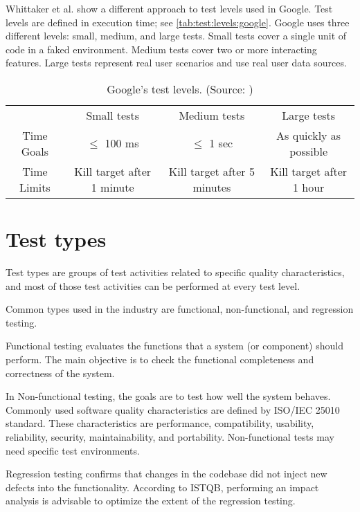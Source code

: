 Whittaker et al. show \cite{google:2012} a different approach to test levels used
in Google.
Test levels are defined in execution time; see \autoref{tab:test:levels:google}.
Google uses three different levels: small, medium, and large tests.
Small tests cover a single unit of code in a faked environment.
Medium tests cover two or more interacting features.
Large tests represent real user scenarios and use real user data sources.

\begin{table}
    \begin{tabular}{|| c c c c ||}
        \hline
        & Small tests & Medium tests & Large tests\\
        Time Goals & $\leq$ 100 ms & $\leq$ 1 sec & As quickly as possible \\
        Time Limits & Kill target after 1 minute & Kill target after 5 minutes & Kill target after 1 hour \\
        \hline
    \end{tabular}
    \caption{Google's test levels. (Source: \cite{google:2012})}
    \label{tab:test:levels:google}
\end{table}

\section{Test types}
Test types are groups of test activities related to specific quality characteristics, and most of those test activities can be performed at every test level. \cite{ctfl_syllabus:2023}

Common types used in the industry are functional, non-functional, and regression testing.

Functional testing evaluates the functions that a system (or component) should perform. The main objective is to check the functional completeness and correctness of the system.

In Non-functional testing, the goals are to test how well the system behaves. Commonly used software quality characteristics are defined by ISO/IEC 25010 standard. These characteristics are performance, compatibility, usability, reliability, security, maintainability, and portability. Non-functional tests may need specific test environments.

Regression testing confirms that changes in the codebase did not inject new defects into the functionality. According to ISTQB, performing an impact analysis is advisable to optimize the extent of the regression testing.

